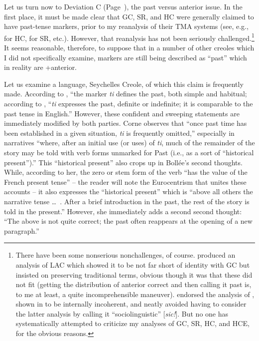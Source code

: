 Let us turn now to Deviation C (Page~\pageref{majordeviations}), the past versus anterior issue. In the first place, it must be made clear that GC, SR, and HC were generally claimed to have past-tense markers, prior to my re\-analysis of their TMA systems (see, e.g., \citet{Hall1953} for HC, \citet{Voorhoeve1957} for SR, etc.). However, that reanalysis has not been seriously challenged.\footnote{There have been some nonserious nonchallenges, of course. \citet{Christie1976} produced an analysis of LAC which showed it to be not far short of identity with GC but insisted on preserving traditional terms, obvious though it was that these did not fit (getting the distri\-bution of anterior correct and then calling it past is, to me at least, a quite incomprehensible maneuver). \citet{Seuren1980} endorsed the analysis of \citet{Voorhoeve1957}, shown in \citet{Bickerton1975} to be intern\-ally incoherent, and neatly avoided having to consider the latter analy\-sis by calling it ``sociolinguistic'' [\textit{sic!}]. But no one has systematically attempted to criticize my analyses of GC, SR, HC, and HCE, for the obvious reasons.} It seems reasonable, therefore, to suppose that in a number of other creoles which I did not specifically examine, markers are still being described as ``past'' which in reality are +anterior.

Let us examine a language, Seychelles Creole, of which this claim is frequently made. According to \citet[102]{Corne1977}, ``the marker \textit{ti} defines the past, both simple and habitual{\textquotedbl}; according to \citet[55]{Bollee1977}, ``\textit{ti} expresses the past, definite or indefinite; it is comparable to the past tense in English.'' However, these confident and sweeping statements are immediately modified by both parties. Corne observes that ``once past time has been established in a given situation, \textit{ti} is frequently omitted,'' especially in narratives ``where, after an initial use (or uses) of \textit{ti}, much of the remainder of the story may be told with verb forms unmarked for Past (i.e., as a sort of ``historical present'').'' This ``historical present'' also crops up in Bollée's second thoughts. While, according to her, the zero or stem form of the verb ``has the value of the French present tense'' -- the reader will note the Euro\-centrism that unites these accounts -- it also expresses the ``historical present'' which is ``above all others the narrative tense \ldots~. After a brief introduction in the past, the rest of the story is told in the pres\-ent.'' However, she immediately adds a second second thought: ``The above is not quite correct; the past often reappears at the opening of a new paragraph.''

